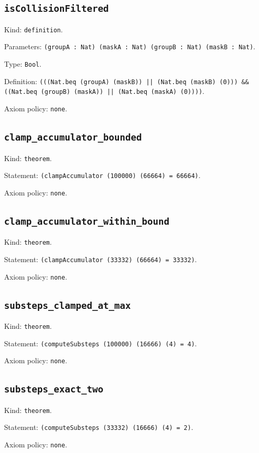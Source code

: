 \documentclass[11pt]{article}
\begin{document}
\subsection*{\texttt{isCollisionFiltered}}
\noindent Kind: \texttt{definition}.\par
\noindent Parameters: \texttt{(groupA : Nat) (maskA : Nat) (groupB : Nat) (maskB : Nat)}.\par
\noindent Type: \texttt{Bool}.\par
\noindent Definition: \texttt{(((Nat.beq (groupA) (maskB)) || (Nat.beq (maskB) (0))) \&\& ((Nat.beq (groupB) (maskA)) || (Nat.beq (maskA) (0))))}.\par
\noindent Axiom policy: \texttt{none}.\par
\subsection*{\texttt{clamp\_accumulator\_bounded}}
\noindent Kind: \texttt{theorem}.\par
\noindent Statement: \texttt{(clampAccumulator (100000) (66664) = 66664)}.\par
\noindent Axiom policy: \texttt{none}.\par
\subsection*{\texttt{clamp\_accumulator\_within\_bound}}
\noindent Kind: \texttt{theorem}.\par
\noindent Statement: \texttt{(clampAccumulator (33332) (66664) = 33332)}.\par
\noindent Axiom policy: \texttt{none}.\par
\subsection*{\texttt{substeps\_clamped\_at\_max}}
\noindent Kind: \texttt{theorem}.\par
\noindent Statement: \texttt{(computeSubsteps (100000) (16666) (4) = 4)}.\par
\noindent Axiom policy: \texttt{none}.\par
\subsection*{\texttt{substeps\_exact\_two}}
\noindent Kind: \texttt{theorem}.\par
\noindent Statement: \texttt{(computeSubsteps (33332) (16666) (4) = 2)}.\par
\noindent Axiom policy: \texttt{none}.\par
\end{document}
